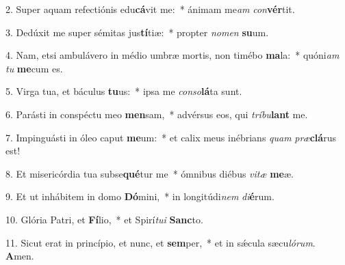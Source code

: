 2. Super aquam refectiónis edu\textbf{cá}vit me:~*  ánimam me\textit{am} \textit{con}\textbf{vér}tit.\

3. Dedúxit me super sémitas jus\textbf{tí}tiæ:~*  propter \textit{no}\textit{men} \textbf{su}um.\

4. Nam, etsi ambulávero in médio umbræ mortis, non timébo \textbf{ma}la:~*  quóni\textit{am} \textit{tu} \textbf{me}cum es.\

5. Virga tua, et báculus \textbf{tu}us:~*  ipsa me \textit{con}\textit{so}\textbf{lá}ta sunt.\

6. Parásti in conspéctu meo \textbf{men}sam,~*  advérsus eos, qui \textit{trí}\textit{bu}\textbf{lant} me.\

7. Impinguásti in óleo caput \textbf{me}um:~*  et calix meus inébrians \textit{quam} \textit{præ}\textbf{clá}rus est!\

8. Et misericórdia tua subse\textbf{qué}tur me~*  ómnibus diébus \textit{vi}\textit{tæ} \textbf{me}æ.\

9. Et ut inhábitem in domo \textbf{Dó}mini,~*  in longitúdi\textit{nem} \textit{di}\textbf{é}rum.\

10. Glória Patri, et \textbf{Fí}lio,~*  et Spirí\textit{tu}\textit{i} \textbf{Sanc}to.\

11. Sicut erat in princípio, et nunc, et \textbf{sem}per,~*  et in sǽcula sæcu\textit{ló}\textit{rum}. \textbf{A}men.\

